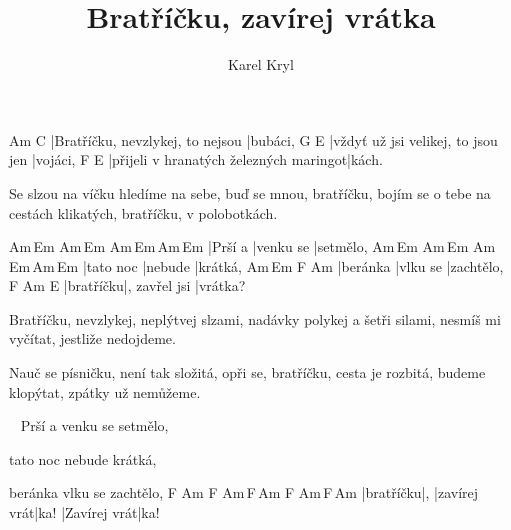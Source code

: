 \documentclass{song}
\title{Bratříčku, zavírej vrátka}
\author{Karel Kryl}
\begin{document}
\strophe
Am                               C
|Bratříčku, nevzlykej, to nejsou |bubáci,
G                                  E\7
|vždyť už jsi velikej, to jsou jen |vojáci,
F                                      E
|přijeli v hranatých železných maringot|kách.
\endstrophe

\strophe*
Se slzou na víčku hledíme na sebe,
buď se mnou, bratříčku, bojím se o tebe
na cestách klikatých, bratříčku, v polobotkách.
\endstrophe

Am\,Em  Am\,Em    Am\,Em\,Am\,Em
|Prší a |venku se |setmělo,
Am\,Em    Am\,Em  Am\,Em\,Am\,Em
|tato noc |nebude |krátká,
Am\,Em   F        Am
|beránka |vlku se |zachtělo,
F         Am            E
|bratříčku|, zavřel jsi |vrátka?
\endstrophe

\strophe*
Bratříčku, nevzlykej, neplýtvej slzami,
nadávky polykej a šetři silami,
nesmíš mi vyčítat, jestliže nedojdeme.
\endstrophe

\strophe*
Nauč se písničku, není tak složitá,
opři se, bratříčku, cesta je rozbitá,
budeme klopýtat, zpátky už nemůžeme.
\endstrophe

~
Prší a venku se setmělo,

tato noc nebude krátká,

beránka vlku se zachtělo,
F         Am F            Am\,F\,Am F            Am\,F\,Am
|bratříčku|, |zavírej vrát|ka!      |Zavírej vrát|ka!
\endstrophe
\end{document}

